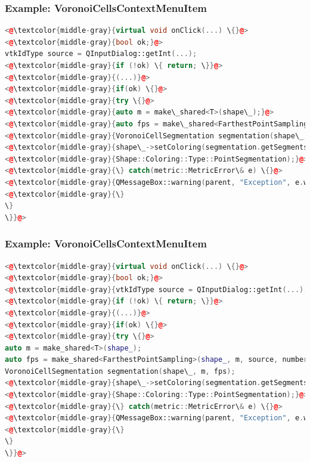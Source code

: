 \documentclass[compress]{beamer}
\begin{document}
\begin{frame}[fragile]
\frametitle{Example: VoronoiCellsContextMenuItem}

\begin{lstlisting}[language=C++, numbers=none]
<@\textcolor{middle-gray}{virtual void onClick(...) \{}@>
<@\textcolor{middle-gray}{bool ok;}@>
vtkIdType source = QInputDialog::getInt(...);
<@\textcolor{middle-gray}{if (!ok) \{ return; \}}@>
<@\textcolor{middle-gray}{(...)}@>
<@\textcolor{middle-gray}{if(ok) \{}@>
<@\textcolor{middle-gray}{try \{}@>
<@\textcolor{middle-gray}{auto m = make\_shared<T>(shape\_);}@>
<@\textcolor{middle-gray}{auto fps = make\_shared<FarthestPointSampling>(shape\_, m, source, numberOfSegments);}@>
<@\textcolor{middle-gray}{VoronoiCellSegmentation segmentation(shape\_, m, fps);}@>
<@\textcolor{middle-gray}{shape\_->setColoring(segmentation.getSegments(), }@>
<@\textcolor{middle-gray}{Shape::Coloring::Type::PointSegmentation);}@>
<@\textcolor{middle-gray}{\} catch(metric::MetricError\& e) \{}@>
<@\textcolor{middle-gray}{QMessageBox::warning(parent, "Exception", e.what());}@>
<@\textcolor{middle-gray}{\}
\}
\}}@>
\end{lstlisting}

\end{frame}

\begin{frame}[fragile]
\frametitle{Example: VoronoiCellsContextMenuItem}

\begin{lstlisting}[language=C++, numbers=none]
<@\textcolor{middle-gray}{virtual void onClick(...) \{}@>
<@\textcolor{middle-gray}{bool ok;}@>
<@\textcolor{middle-gray}{vtkIdType source = QInputDialog::getInt(...);}@>
<@\textcolor{middle-gray}{if (!ok) \{ return; \}}@>
<@\textcolor{middle-gray}{(...)}@>
<@\textcolor{middle-gray}{if(ok) \{}@>
<@\textcolor{middle-gray}{try \{}@>
auto m = make_shared<T>(shape_);
auto fps = make_shared<FarthestPointSampling>(shape_, m, source, numberOfSegments);
VoronoiCellSegmentation segmentation(shape\_, m, fps);
<@\textcolor{middle-gray}{shape\_->setColoring(segmentation.getSegments(), }@>
<@\textcolor{middle-gray}{Shape::Coloring::Type::PointSegmentation);}@>
<@\textcolor{middle-gray}{\} catch(metric::MetricError\& e) \{}@>
<@\textcolor{middle-gray}{QMessageBox::warning(parent, "Exception", e.what());}@>
<@\textcolor{middle-gray}{\}
\}
\}}@>
\end{lstlisting}

\end{frame}
\end{document}
